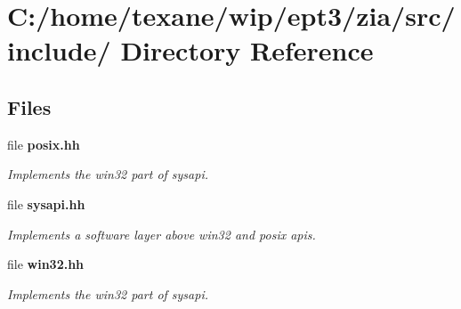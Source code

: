 \section{C:/home/texane/wip/ept3/zia/src/include/ Directory Reference}
\label{dir_C_3A_2Fhome_2Ftexane_2Fwip_2Fept3_2Fzia_2Fsrc_2Finclude_2F}
\subsection*{Files}
\begin{CompactItemize}
\item 
file {\bf posix.hh}
\begin{CompactList}\small\item\em Implements the win32 part of sysapi. \item\end{CompactList}

\item 
file {\bf sysapi.hh}
\begin{CompactList}\small\item\em Implements a software layer above win32 and posix apis. \item\end{CompactList}

\item 
file {\bf win32.hh}
\begin{CompactList}\small\item\em Implements the win32 part of sysapi. \item\end{CompactList}

\end{CompactItemize}

